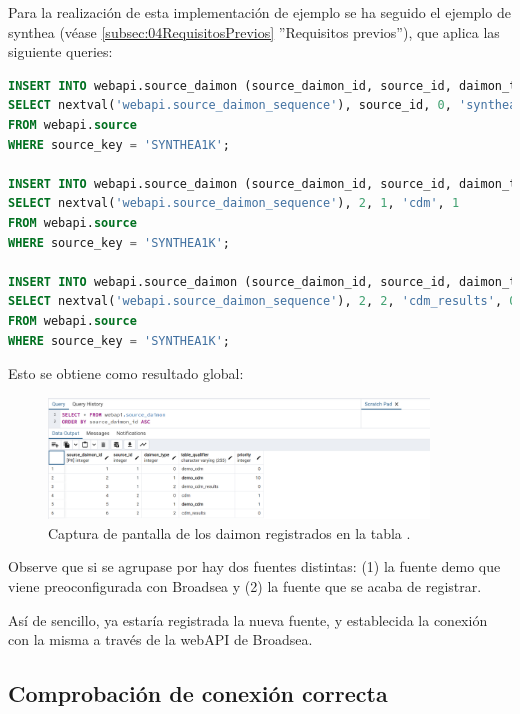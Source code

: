 \begin{enumerate}
    Para la realización de esta implementación de ejemplo se ha seguido el ejemplo de synthea (véase \ref{subsec:04RequisitosPrevios} ''Requisitos previos''), que aplica las siguiente queries:

\begin{lstlisting}[language=sql]
INSERT INTO webapi.source_daimon (source_daimon_id, source_id, daimon_type, table_qualifier, priority) 
SELECT nextval('webapi.source_daimon_sequence'), source_id, 0, 'synthea', 0
FROM webapi.source
WHERE source_key = 'SYNTHEA1K';

INSERT INTO webapi.source_daimon (source_daimon_id, source_id, daimon_type, table_qualifier, priority) 
SELECT nextval('webapi.source_daimon_sequence'), 2, 1, 'cdm', 1
FROM webapi.source
WHERE source_key = 'SYNTHEA1K';

INSERT INTO webapi.source_daimon (source_daimon_id, source_id, daimon_type, table_qualifier, priority) 
SELECT nextval('webapi.source_daimon_sequence'), 2, 2, 'cdm_results', 0
FROM webapi.source
WHERE source_key = 'SYNTHEA1K';
\end{lstlisting}

    Esto se obtiene como resultado global:

\begin{figure}[H]
    \centering
    \includegraphics[width=0.90\textwidth]{figures/queryDaimon.png}
    \caption{Captura de pantalla de los daimon registrados en la tabla .}
    \label{fig:queryDaimon}
\end{figure}

    Observe que si se agrupase por  hay dos fuentes distintas: (1) la fuente demo que viene preoconfigurada con Broadsea y (2) la fuente que se acaba de registrar.

\end{enumerate}

Así de sencillo, ya estaría registrada la nueva fuente, y establecida la conexión con la misma a través de la webAPI de Broadsea.

\subsection{Comprobación de conexión correcta} \label{subsec:04comprobacion}

